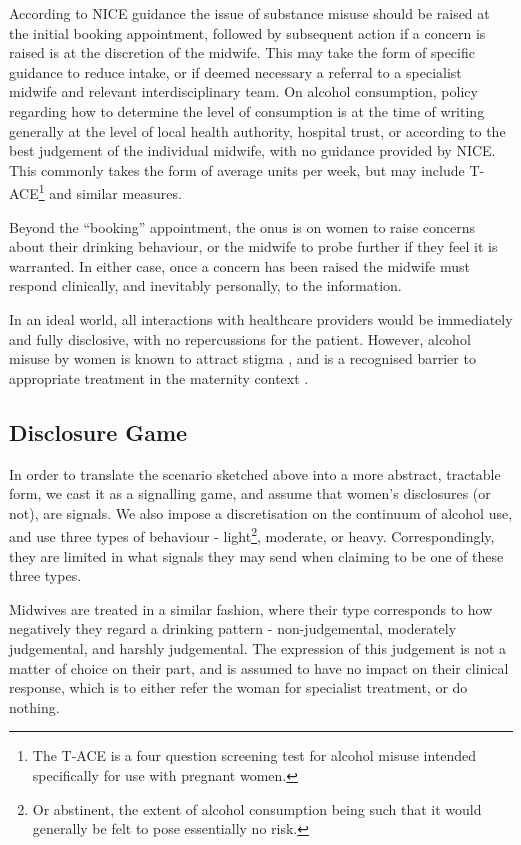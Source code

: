 \documentclass[graybox]{svmult}
\begin{document}
According to NICE guidance \citep{NICE2010a,NICE2010} the issue of substance misuse should be raised at the initial booking appointment, followed by subsequent action if a concern is raised is at the discretion of the midwife. This may take the form of specific guidance to reduce intake, or if deemed necessary a referral to a specialist midwife and relevant interdisciplinary team. On alcohol consumption, policy regarding how to determine the level of consumption is at the time of writing generally at the level of local health authority, hospital trust, or according to the best judgement of the individual midwife, with no guidance provided by NICE. This commonly takes the form of average units per week, but may include \ac{T-ACE}\footnote{The \ac{T-ACE} is a four question screening test for alcohol misuse intended specifically for use with pregnant women.} \citep{Sokol1989863} and similar measures. 

Beyond the \enquote{booking} appointment, the onus is on women to raise concerns about their drinking behaviour, or the midwife to probe further if they feel it is warranted. In either case, once a concern has been raised the midwife must respond clinically, and inevitably personally, to the information.

In an ideal world, all interactions with healthcare providers would be immediately and fully disclosive, with no repercussions for the patient. However, alcohol misuse by women is known to attract stigma \citep{Gomberg1988}, and is a recognised barrier to appropriate treatment in the maternity context \citep{NICE2010,Radcliffe2011}.


\subsection{Disclosure Game}
\label{sub:the_game}

In order to translate the scenario sketched above into a more abstract, tractable form, we cast it as a signalling game, and assume that women's disclosures (or not), are signals. We also impose a discretisation on the continuum of alcohol use, and use three types of behaviour - light\footnote{Or abstinent, the extent of alcohol consumption being such that it would generally be felt to pose essentially no risk.}, moderate, or heavy. Correspondingly, they are limited in what signals they may send when claiming to be one of these three types. 

Midwives are treated in a similar fashion, where their type corresponds to how negatively they regard a drinking pattern - non-judgemental, moderately judgemental, and harshly judgemental. The expression of this judgement is not a matter of choice on their part, and is assumed to have no impact on their clinical response, which is to either refer the woman for specialist treatment, or do nothing.
\end{document}
